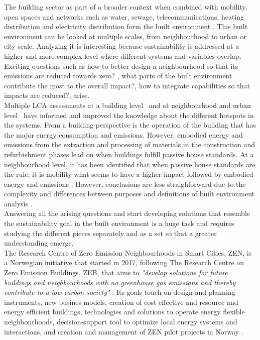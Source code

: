 The building sector as part of a broader context when combined with mobility, open spaces and networks such as water, sewage, telecommunications, heating distribution and electricity distribution form the built environment \cite{Lotteau2015} \cite{Popovici2013}. This built environment can be looked at multiple scales, from neighbourhood to urban or city scale. Analyzing it is interesting because sustainability is addressed at a higher and more complex level where different systems and variables overlap. Exciting questions such as how to better design a neighbourhood so that its emissions are reduced towards zero? \cite{ZENJan} \cite{ZENDefinition}, what parts of the built environment contribute the most to the overall impact?, how to integrate capabilities so that impacts are reduced?, arise. \\

Multiple LCA assessments at a building level \cite{a}\cite{b}\cite{a}\ and at neighbourhood \cite{a}\cite{a} and urban level \cite{a}\cite{a}\ have informed and improved the knowledge about the different hotspots in the systems. From a building perspective is the operation of the building that has the major energy consumption and emissions. However, embodied energy and emissions from the extraction and processing of materials in the construction and refurbishment phases lead on when buildings fulfill passive house standards. At a neighbourhood level, it has been identified that when passive house standards are the rule, it is mobility what seems to have a higher impact followed by embodied energy and emissions\cite{Lottau2015} \cite{report2017ZEN}. However, conclusions are less straighforward due to the complexity and differences between purposes and definitions of built environment analysis\cite{Lottau2015} \cite{others}.\\

Answering all the arising questions and start developing solutions that resemble the sustainability goal in the built environment is a huge task and requires studying the different pieces separately and as a set so that a greater understanding emerge. \\

The Research Centre of Zero Emission Neighbourhoods in Smart Cities, ZEN, is a Norwegian initiative that started in 2017, following The Research Centre on Zero Emission Buildings, ZEB, that aims to \textit{"develop solutions for future buildings and neighbourhoods with no greenhouse gas emissions and thereby contribute to a low carbon society"} \cite{ZENwebsite}. Its goals touch on design and planning instruments, new busines models, creation of cost effective and resource and energy efficient buildings, technologies and solutions to operate energy flexible neighbourhoods, decision-support tool to optimize local energy systems and interactions, and creation and management of ZEN pilot projects in Norway \cite{ZENwebsite}.\\

